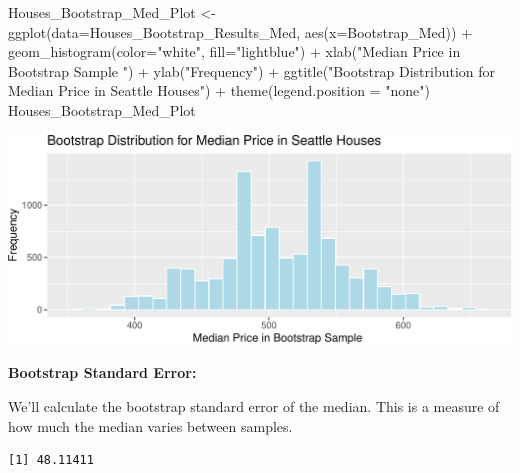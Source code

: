 \documentclass[
  letterpaper,
  DIV=11,
  numbers=noendperiod]{scrreprt}
\newenvironment{Shaded}{\begin{snugshade}}{\end{snugshade}}
\newcommand{\AttributeTok}[1]{\textcolor[rgb]{0.40,0.45,0.13}{#1}}
\newcommand{\FunctionTok}[1]{\textcolor[rgb]{0.28,0.35,0.67}{#1}}
\newcommand{\NormalTok}[1]{\textcolor[rgb]{0.00,0.23,0.31}{#1}}
\newcommand{\OtherTok}[1]{\textcolor[rgb]{0.00,0.23,0.31}{#1}}
\newcommand{\SpecialCharTok}[1]{\textcolor[rgb]{0.37,0.37,0.37}{#1}}
\newcommand{\StringTok}[1]{\textcolor[rgb]{0.13,0.47,0.30}{#1}}
\begin{document}
\begin{Shaded}
\begin{Highlighting}[]
\NormalTok{Houses\_Bootstrap\_Med\_Plot }\OtherTok{\textless{}{-}} \FunctionTok{ggplot}\NormalTok{(}\AttributeTok{data=}\NormalTok{Houses\_Bootstrap\_Results\_Med, }
                                    \FunctionTok{aes}\NormalTok{(}\AttributeTok{x=}\NormalTok{Bootstrap\_Med)) }\SpecialCharTok{+}  
  \FunctionTok{geom\_histogram}\NormalTok{(}\AttributeTok{color=}\StringTok{"white"}\NormalTok{, }\AttributeTok{fill=}\StringTok{"lightblue"}\NormalTok{) }\SpecialCharTok{+}
  \FunctionTok{xlab}\NormalTok{(}\StringTok{"Median Price in Bootstrap Sample "}\NormalTok{) }\SpecialCharTok{+} \FunctionTok{ylab}\NormalTok{(}\StringTok{"Frequency"}\NormalTok{) }\SpecialCharTok{+}
  \FunctionTok{ggtitle}\NormalTok{(}\StringTok{"Bootstrap Distribution for Median Price in Seattle Houses"}\NormalTok{) }\SpecialCharTok{+} 
  \FunctionTok{theme}\NormalTok{(}\AttributeTok{legend.position =} \StringTok{"none"}\NormalTok{) }
\NormalTok{Houses\_Bootstrap\_Med\_Plot }
\end{Highlighting}
\end{Shaded}

\includegraphics{Ch3_files/figure-pdf/unnamed-chunk-95-1.pdf}

\textbf{Bootstrap Standard Error:}

We'll calculate the bootstrap standard error of the median. This is a
measure of how much the median varies between samples.

\begin{Shaded}
\end{Shaded}

\begin{verbatim}
[1] 48.11411
\end{verbatim}
\end{document}
